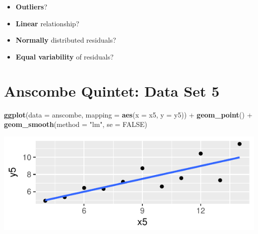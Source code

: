 \documentclass[]{article}
\newenvironment{Shaded}{\begin{snugshade}}{\end{snugshade}}
\newcommand{\KeywordTok}[1]{\textcolor[rgb]{0.13,0.29,0.53}{\textbf{{#1}}}}
\newcommand{\DataTypeTok}[1]{\textcolor[rgb]{0.13,0.29,0.53}{{#1}}}
\newcommand{\StringTok}[1]{\textcolor[rgb]{0.31,0.60,0.02}{{#1}}}
\newcommand{\OtherTok}[1]{\textcolor[rgb]{0.56,0.35,0.01}{{#1}}}
\newcommand{\NormalTok}[1]{{#1}}
\providecommand{\tightlist}{%
  \setlength{\itemsep}{0pt}\setlength{\parskip}{0pt}}
\begin{document}
\begin{itemize}
\tightlist
\item
  \textbf{Outliers}?
\end{itemize}

\vspace{1cm}

\begin{itemize}
\tightlist
\item
  \textbf{Linear} relationship?
\end{itemize}

\vspace{1cm}

\begin{itemize}
\tightlist
\item
  \textbf{Normally} distributed residuals?
\end{itemize}

\vspace{1cm}

\begin{itemize}
\tightlist
\item
  \textbf{Equal variability} of residuals?
\end{itemize}

\newpage

\section{Anscombe Quintet: Data Set
5}\label{anscombe-quintet-data-set-5}

\begin{Shaded}
\begin{Highlighting}[]
\KeywordTok{ggplot}\NormalTok{(}\DataTypeTok{data =} \NormalTok{anscombe, }\DataTypeTok{mapping =} \KeywordTok{aes}\NormalTok{(}\DataTypeTok{x =} \NormalTok{x5, }\DataTypeTok{y =} \NormalTok{y5)) +}
\StringTok{  }\KeywordTok{geom_point}\NormalTok{() +}
\StringTok{  }\KeywordTok{geom_smooth}\NormalTok{(}\DataTypeTok{method =} \StringTok{"lm"}\NormalTok{, }\DataTypeTok{se =} \OtherTok{FALSE}\NormalTok{)}
\end{Highlighting}
\end{Shaded}

\includegraphics{20180417_anscombe_residuals_files/figure-latex/unnamed-chunk-15-1.pdf}
\end{document}
